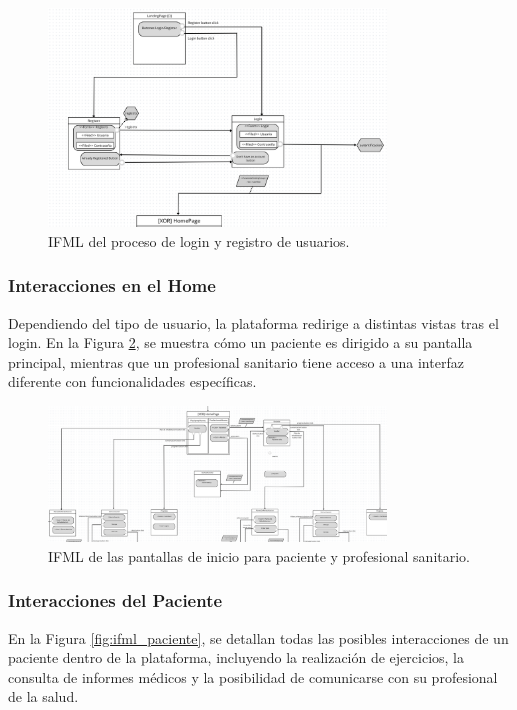 \documentclass{article}
\begin{document}
\begin{figure}[H]
	\centering
	\includegraphics[width=0.8\textwidth]{images/ifml_login.png}
	\caption{IFML del proceso de login y registro de usuarios.}
	\label{fig:ifml_login}
\end{figure}

\subsubsection{Interacciones en el Home}

Dependiendo del tipo de usuario, la plataforma redirige a distintas vistas tras el login. En la Figura \ref{fig:ifml_home}, se muestra cómo un paciente es dirigido a su pantalla principal, mientras que un profesional sanitario tiene acceso a una interfaz diferente con funcionalidades específicas.

\begin{figure}[H]
	\centering
	\includegraphics[width=0.8\textwidth]{images/ifml_home.png}
	\caption{IFML de las pantallas de inicio para paciente y profesional sanitario.}
	\label{fig:ifml_home}
\end{figure}

\subsubsection{Interacciones del Paciente}

En la Figura \ref{fig:ifml_paciente}, se detallan todas las posibles interacciones de un paciente dentro de la plataforma, incluyendo la realización de ejercicios, la consulta de informes médicos y la posibilidad de comunicarse con su profesional de la salud.
\end{document}
